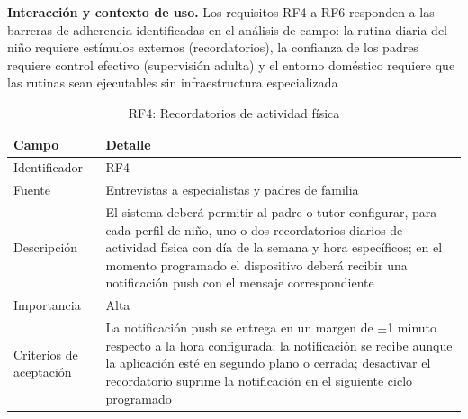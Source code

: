 					\textbf{Interacción y contexto de uso.} Los requisitos RF4 a RF6 responden a las barreras de adherencia identificadas en el análisis de campo: la rutina diaria del niño requiere estímulos externos (recordatorios), la confianza de los padres requiere control efectivo (supervisión adulta) y el entorno doméstico requiere que las rutinas sean ejecutables sin infraestructura especializada~\cite{Schoeppe2017,VegaDiaz2023}.
					
					\begin{table}[H]
						\centering\small
						\caption{RF4: Recordatorios de actividad física}
						\label{tab:rf4}
						\begin{tabular}{p{3.5cm}p{11cm}}
							\hline
							\textbf{Campo} & \textbf{Detalle} \\
							\hline
							Identificador & RF4 \\
							
							Fuente & Entrevistas a especialistas y padres de familia \\
							
							Descripción & El sistema deberá permitir al padre o tutor configurar, para cada perfil de niño, uno o dos recordatorios diarios de actividad física con día de la semana y hora específicos; en el momento programado el dispositivo deberá recibir una notificación push con el mensaje correspondiente \\
							
							Importancia & Alta \\
							
							Criterios de aceptación & La notificación push se entrega en un margen de $\pm$1 minuto respecto a la hora configurada; la notificación se recibe aunque la aplicación esté en segundo plano o cerrada; desactivar el recordatorio suprime la notificación en el siguiente ciclo programado \\
							\hline
						\end{tabular}
					\end{table} \tblnote
					
